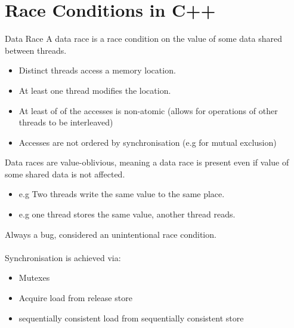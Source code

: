 \section{Race Conditions in C++}
\begin{definitionbox}{Data Race}
    A data race is a race condition on the value of some data shared between threads.
    \begin{itemize}
      \item Distinct threads access a memory location.
      \item At least one thread modifies the location.
      \item At least of of the accesses is non-atomic (allows for operations of other threads to be interleaved)
      \item Accesses are not ordered by synchronisation (e.g for mutual exclusion)
    \end{itemize}
    Data races are value-oblivious, meaning a data race is present even if value of some shared data is not affected.
    \begin{itemize}
      \item e.g Two threads write the same value to the same place.
      \item e.g one thread stores the same value, another thread reads. 
    \end{itemize}
    Always a bug, considered an unintentional race condition.
    \\
    \\ Synchronisation is achieved via:
    \begin{itemize}
      \item Mutexes
      \item Acquire load from release store
      \item sequentially consistent load from sequentially consistent store
    \end{itemize}
\end{definitionbox}
